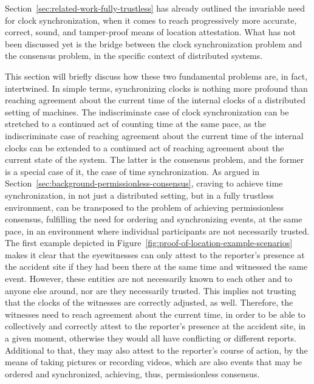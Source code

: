 Section~\ref{sec:related-work-fully-trustless} has already outlined the invariable need for clock synchronization, when it comes to reach progressively more accurate, correct, sound, and tamper-proof means of location attestation. What has not been discussed yet is the bridge between the clock synchronization problem and the consensus problem, in the specific context of distributed systems. 

This section will briefly discuss how these two fundamental problems are, in fact, intertwined. In simple terms, synchronizing clocks is nothing more profound than reaching agreement about the current time of the internal clocks of a distributed setting of machines. The indiscriminate case of clock synchronization can be stretched to a continued act of counting time at the same pace, as the indiscriminate case of reaching agreement about the current time of the internal clocks can be extended to a continued act of reaching agreement about the current state of the system. The latter is the consensus problem, and the former is a special case of it, the case of time synchronization. As argued in Section~\ref{sec:background-permissionless-consensus}, craving to achieve time synchronization, in not just a distributed setting, but in a fully trustless environment, can be transposed to the problem of achieving permissionless consensus, fulfilling the need for ordering and synchronizing events, at the same pace, in an environment where individual participants are not necessarily trusted. The first example depicted in Figure~\ref{fig:proof-of-location-example-scenarios} makes it clear that the eyewitnesses can only attest to the reporter's presence at the accident site if they had been there at the same time and witnessed the same event. However, these entities are not necessarily known to each other and to anyone else around, nor are they necessarily trusted. This implies not trusting that the clocks of the witnesses are correctly adjusted, as well. Therefore, the witnesses need to reach agreement about the current time, in order to be able to collectively and correctly attest to the reporter's presence at the accident site, in a given moment, otherwise they would all have conflicting or different reports. Additional to that, they may also attest to the reporter's course of action, by the means of taking pictures or recording videos, which are also events that may be ordered and synchronized, achieving, thus, permissionless consensus.


